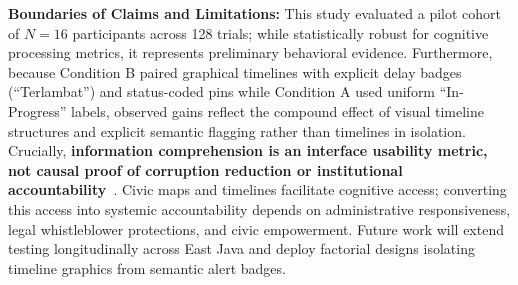 \documentclass[runningheads]{llncs}
\newcommand{\hl}[1]{#1}
\begin{document}
\noindent\textbf{Boundaries of Claims and Limitations:} This study evaluated a pilot cohort of $N = 16$ participants across 128 trials; while statistically robust for cognitive processing metrics, it represents preliminary behavioral evidence. \hl{Furthermore, because Condition B paired graphical timelines with explicit delay badges (``Terlambat'') and status-coded pins while Condition A used uniform ``In-Progress'' labels, observed gains reflect the compound effect of visual timeline structures and explicit semantic flagging rather than timelines in isolation.} Crucially, \textbf{information comprehension is an interface usability metric, not causal proof of corruption reduction or institutional accountability}~\cite{ambituuni2025infrastructure,saelawong2024transparency}. Civic maps and timelines facilitate cognitive access; converting this access into systemic accountability depends on administrative responsiveness, legal whistleblower protections, and civic empowerment. \hl{Future work will extend testing longitudinally across East Java and deploy factorial designs isolating timeline graphics from semantic alert badges.}



%
%
\renewcommand{\doi}[1]{\href{https://doi.org/#1}{\nolinkurl{doi:#1}}}
\makeatletter
\renewenvironment{thebibliography}[1]
     {\section*{\refname}%
      \enlargethispage{5\baselineskip}%
      
      \def\@biblabel##1{##1.}%
      \fontsize{5.0pt}{5.6pt}\selectfont
      \raggedbottom
      \list{\@biblabel{\@arabic\c@enumiv}}%
           {\settowidth\labelwidth{\@biblabel{#1}}%
            \leftmargin\labelwidth
            \advance\leftmargin\labelsep
            \setlength{\itemsep}{-2.5pt}%
            \setlength{\parsep}{0pt}%
            \usecounter{enumiv}%
            \let\p@enumiv\@empty
            \renewcommand\theenumiv{\@arabic\c@enumiv}}%
      \sloppy\clubpenalty4000\widowpenalty4000
      \sfcode`\.=\@m}
     {\def\@noitemerr
       {\@latex@warning{Empty `thebibliography' environment}}%
      \endlist}
\makeatother


\end{document}
